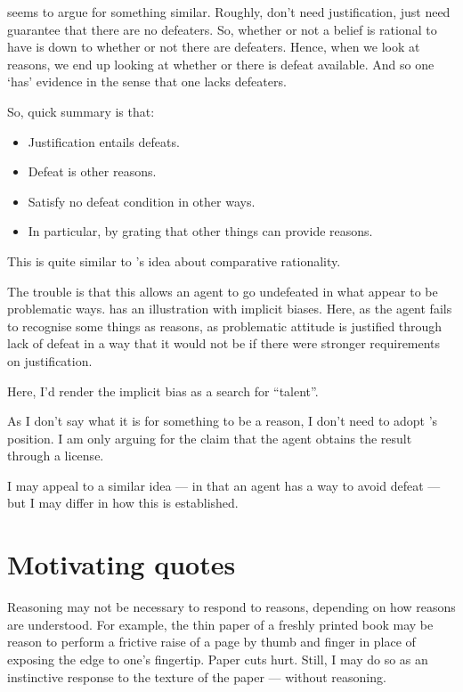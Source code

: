 \documentclass[10pt]{article}
\begin{document}
\begin{note}[Schroeder]
  \textcite{Schroeder:2011aa} seems to argue for something similar.
  Roughly, don't need justification, just need guarantee that there are no defeaters.
  So, whether or not a belief is rational to have is down to whether or not there are defeaters.
  Hence, when we look at reasons, we end up looking at whether or there is defeat available.
  And so one `has' evidence in the sense that one lacks defeaters.

  So, quick summary is that:
  \begin{itemize}
  \item Justification entails defeats.
  \item Defeat is other reasons.
  \item Satisfy no defeat condition in other ways.
  \item In particular, by grating that other things can provide reasons.
  \end{itemize}

  This is quite similar to \citeauthor{Lord:2018aa}'s idea about comparative rationality.

  The trouble is that this allows an agent to go undefeated in what appear to be problematic ways.
  \textcite{Schmidt:2019aa} has an illustration with implicit biases.
  Here, as the agent fails to recognise some things as reasons, as problematic attitude is justified through lack of defeat in a way that it would not be if there were stronger requirements on justification.

  Here, I'd render the implicit bias as a search for ``talent''.

  As I don't say what it is for something to be a reason, I don't need to adopt \citeauthor{Schroeder:2011aa}'s position.
  I am only arguing for the claim that the agent obtains the result through a license.

  I may appeal to a similar idea --- in that an agent has a way to avoid defeat --- but I may differ in how this is established.
\end{note}

\section{Motivating quotes}
\label{sec:motivating-quotes}

Reasoning may not be necessary to respond to reasons, depending on how reasons are understood.
For example, the thin paper of a freshly printed book may be reason to perform a frictive raise of a page by thumb and finger in place of exposing the edge to one's fingertip.
Paper cuts hurt.
Still, I may do so as an instinctive response to the texture of the paper --- without reasoning.
\end{document}
